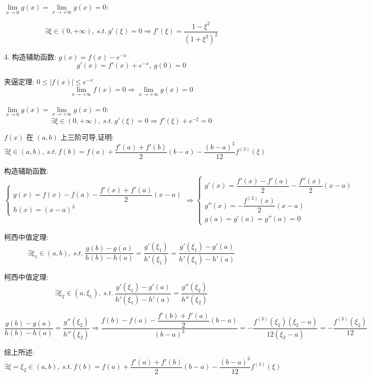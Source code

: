 \begin{solution}
	$\lim\limits_{x\rightarrow 0 }g(x)=\lim\limits_{x\rightarrow  +\infty}g(x)=0$:

	$$\exists\xi\in(0,+\infty),\ s.t.\ g'(\xi)=0\Rightarrow f'(\xi)=\dfrac{1-\xi^2}{(1+\xi^2)^2}$$


	4. 构造辅助函数: $g(x)=f(x)-e^{-x}$
	$$g'(x)=f'(x)+e^{-x},\ g(0)=0$$

	夹逼定理: $0\leq |f(x)|\leq e^{-x}$
	$$\lim\limits_{x\rightarrow +\infty}f(x)=0\Rightarrow \lim\limits_{x\rightarrow +\infty}g(x)=0$$

	$\lim\limits_{x\rightarrow 0 }g(x)=\lim\limits_{x\rightarrow  +\infty}g(x)=0$:
	$$\exists\xi\in(0,+\infty),\ s.t.\ g'(\xi)=0\Rightarrow f'(\xi)+e^{-\xi}=0$$
\end{solution}

\begin{proposition}
	$f(x)$ 在 $(a,b)$ 上三阶可导,证明: 
	$$\exists\xi\in(a,b),\ s.t.\ f(b)=f(a)+\dfrac{f'(a)+f'(b)}{2}(b-a)-\frac{(b-a)^3}{12}f^{(3)}(\xi)$$
\end{proposition}
\begin{solution}

	构造辅助函数:
	$$\begin{cases}
		g(x) = f(x)-f(a)-\dfrac{f'(x)+f'(a)}{2}(x-a)\\
		h(x) = (x-a)^{3} 
	\end{cases}\Rightarrow
	\begin{cases}
		g'(x) = \dfrac{f'(x)-f'(a)}{2} - \dfrac{f''(x)}{2}(x-a)\\
		g''(x) = -\dfrac{f^{(3)}(x)}{2}(x-a)\\
		g(a) = g'(a) = g''(a) = 0 
	\end{cases}$$

	柯西中值定理:
	$$\exists \xi_{1}\in (a,b),\ s.t.\ \dfrac{g(b)-g(a)}{h(b)-h(a)} = \dfrac{g'(\xi_{1})}{h'(\xi_{1})} = \dfrac{g'(\xi_{1})-g'(a)}{h'(\xi_{1})-h'(a)}$$

	柯西中值定理:
	$$\exists \xi_{2}\in (a,\xi_{1}),\ s.t.\ \dfrac{g'(\xi_{1})-g'(a)}{h'(\xi_{1})-h'(a)} = \dfrac{g''(\xi_{2})}{h''(\xi_{2})} $$

	$$\dfrac{g(b)-g(a)}{h(b)-h(a)} = \dfrac{g''(\xi_{2})}{h''(\xi_{2})}\Rightarrow \dfrac{f(b)-f(a)-\dfrac{f'(b)+f'(a)}{2}(b-a)}{(b-a)^{3}} = -\dfrac{f^{(3)}(\xi_{2})(\xi_{2}-a)}{12(\xi_{2}-a)} = -\dfrac{f^{(3)}(\xi_{2})}{12}$$

	综上所述: $\exists \xi = \xi_{2}\in(a,b),\ s.t.\ f(b)=f(a)+\dfrac{f'(a)+f'(b)}{2}(b-a)-\dfrac{(b-a)^3}{12}f^{(3)}(\xi)$

\end{solution}

